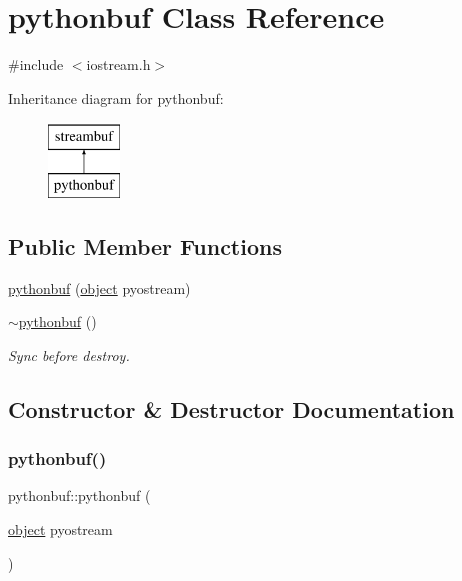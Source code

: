 \hypertarget{classpythonbuf}{}\section{pythonbuf Class Reference}
\label{classpythonbuf}


{\ttfamily \#include $<$iostream.\+h$>$}

Inheritance diagram for pythonbuf\+:\begin{figure}[H]
\begin{center}
\leavevmode
\includegraphics[height=2.000000cm]{classpythonbuf}
\end{center}
\end{figure}
\subsection*{Public Member Functions}
\begin{DoxyCompactItemize}
\item 
\mbox{\hyperlink{classpythonbuf_a3d60ae21b1c99654b44cb16b2f36e5eb}{pythonbuf}} (\mbox{\hyperlink{classobject}{object}} pyostream)
\item 
\mbox{\hyperlink{classpythonbuf_a3f1ff4b8d6c45c702a64251a0212a79c}{$\sim$pythonbuf}} ()
\begin{DoxyCompactList}\small\item\em Sync before destroy. \end{DoxyCompactList}\end{DoxyCompactItemize}


\subsection{Constructor \& Destructor Documentation}
\mbox{\label{classpythonbuf_a3d60ae21b1c99654b44cb16b2f36e5eb}} 
\subsubsection{\texorpdfstring{pythonbuf()}{pythonbuf()}}
{\footnotesize\ttfamily pythonbuf\+::pythonbuf (\begin{DoxyParamCaption}\item[{\mbox{\hyperlink{classobject}{object}}}]{pyostream }\end{DoxyParamCaption})\hspace{0.3cm}{\ttfamily [inline]}}

